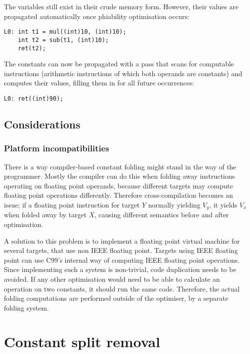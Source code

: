 \documentclass[12pt, a4paper]{article}
\begin{document}
The variables still exist in their crude memory form. However, their values are 
propagated automatically once phiability optimisation occurs:

\begin{lstlisting}
L0:	int t1 = mul((int)10, (int)10);
	int t2 = sub(t1, (int)10);
	ret(t2);
\end{lstlisting}

The constants can now be propagated with a pass that scans for computable 
instructions (arithmetic instructions of which both operands are constants) and 
computes their values, filling them in for all future occurrences:

\begin{lstlisting}
L0:	ret((int)90);
\end{lstlisting}

\subsection{Considerations}
\subsubsection{Platform incompatibilities}
There is a way compiler-based constant folding might stand in the way of the 
programmer. Mostly the compiler can do this when folding
away instructions  operating on floating point operands, because different targets may compute 
floating point operations differently. Therefore cross-compilation becomes an 
issue; if a floating point instruction for target $Y$ normally yielding $V_y$, it 
yields $V_x$ when folded away by target $X$, causing different semantics before and 
after optimisation.\cite{cfld_cross}

A solution to this problem is to implement a floating point virtual machine for 
several targets, that use non IEEE floating point. Targets using IEEE floating 
point can use C99's internal way of computing IEEE floating point operations.
Since implementing such a system is non-trivial, code duplication needs to be 
avoided. If any other optimisation would need to be able to calculate an 
operation on two constants, it should run the same code. Therefore, the actual 
folding computations are performed outside of the optimiser, by a separate 
folding system.


\section{Constant split removal}
\end{document}

